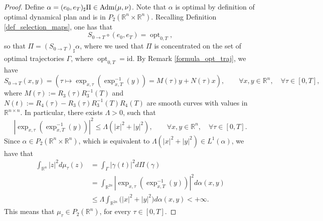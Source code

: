 \documentclass[reqno]{amsart}
\DeclareMathOperator{\opt}{opt}
\theoremstyle{plain}
\theoremstyle{definition}
\theoremstyle{remark}
\newcommand{\Adm}{{\rm Adm}}
\newcommand{\R}{\mathbb{R}}
\begin{document}
    \begin{proof}
        Define $\alpha=(e_0,e_T)_\sharp\Pi\in\Adm(\mu,\nu)$. Note that $\alpha$ is optimal by definition of optimal dynamical plan and is in $P_2(\mathbb{R}^{n}\times \R^n)$. Recalling Definition \ref{def_selection_maps}, one has that
			\begin{equation}
				S_{0\to T}\circ(e_0,e_T)=\opt_{0,T},
			\end{equation}
            so that $\Pi=(S_{0\to T})_\sharp\alpha$, where we used that $\Pi$ is concentrated on the set of optimal trajectories $\Gamma$, where $\opt_{0,T}=\mathrm{id}$.
        By Remark \ref{formula_opt_traj}, we have 
			\begin{equation}
				S_{0\to T}(x,y)=\left(\tau\mapsto\exp_{x,\tau}(\exp_{x,T}^{-1}(y))=M(\tau)y+N(\tau)x\right),\qquad\forall x,y\in\mathbb{R}^n,\quad\forall \tau\in[0,T],
			\end{equation}
			where $M(\tau):=R_3(\tau)R_3^{-1}(T)$ and $N(t):=R_4(\tau)-R_3(\tau)R_3^{-1}(T)R_4(T)$ are smooth curves with values in $\mathbb{R}^{n\times n}$. In particular, there exists $\Lambda>0$, such that
			\begin{equation}\label{dominante_integrabile}
				|\exp_{x,\tau}(\exp_{x,T}^{-1}(y))|^2\leq \Lambda(|x|^2+|y|^2),\qquad\forall x,y\in\mathbb{R}^n,\quad\forall \tau\in[0,T]. 
			\end{equation}
			Since $\alpha\in P_2(\mathbb{R}^n\times\mathbb{R}^n)$, which is equivalent to $\Lambda(|x|^2+|y|^2)\in L^1(\alpha)$, we have that 
			\begin{align}
            \int_{\mathbb{R}^n}|z|^2d\mu_\tau(z)&=\int_{\Gamma}|\gamma(t)|^2d\Pi(\gamma)\\
				&=\int_{\mathbb{R}^{2n}}|\exp_{x,\tau}(\exp_{x,T}^{-1}(y))|^2d\alpha(x,y)\\
				&\leq \Lambda\int_{\mathbb{R}^{2n}}\big(|x|^2+|y|^2\big)d\alpha(x,y)<+\infty.
			\end{align} 
			This means that $\mu_\tau\in P_2(\mathbb{R}^n)$, for every $\tau\in[0,T]$.
            

\end{proof}
\end{document}
